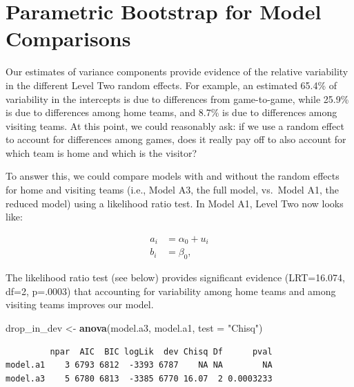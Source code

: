 \documentclass[
]{krantz}
\newenvironment{Shaded}{\begin{snugshade}}{\end{snugshade}}
\newcommand{\DataTypeTok}[1]{\textcolor[rgb]{0.27,0.27,0.27}{#1}}
\newcommand{\KeywordTok}[1]{\textcolor[rgb]{0.27,0.27,0.27}{\textbf{#1}}}
\newcommand{\NormalTok}[1]{#1}
\newcommand{\StringTok}[1]{\textcolor[rgb]{0.5,0.5,0.5}{#1}}
\begin{document}
\hypertarget{glmm-paraboot}{%
\section{Parametric Bootstrap for Model Comparisons}\label{glmm-paraboot}}

Our estimates of variance components provide evidence of the relative variability in the different Level Two random effects. For example, an estimated 65.4\% of variability in the intercepts is due to differences from game-to-game, while 25.9\% is due to differences among home teams, and 8.7\% is due to differences among visiting teams. At this point, we could reasonably ask: if we use a random effect to account for differences among games, does it really pay off to also account for which team is home and which is the visitor?

To answer this, we could compare models with and without the random effects for home and visiting teams (i.e., Model A3, the full model, vs.~Model A1, the reduced model) using a likelihood ratio test. In Model A1, Level Two now looks like:

\begin{align*}
a_{i} & = \alpha_{0}+u_{i} \\
b_{i} & = \beta_{0},
\end{align*}

The likelihood ratio test (see below) provides significant evidence (LRT=16.074, df=2, p=.0003) that accounting for variability among home teams and among visiting teams improves our model.

\begin{Shaded}
\begin{Highlighting}[]
\NormalTok{drop_in_dev <-}\StringTok{ }\KeywordTok{anova}\NormalTok{(model.a3, model.a1, }\DataTypeTok{test =} \StringTok{"Chisq"}\NormalTok{)}
\end{Highlighting}
\end{Shaded}

\begin{verbatim}
         npar  AIC  BIC logLik  dev Chisq Df      pval
model.a1    3 6793 6812  -3393 6787    NA NA        NA
model.a3    5 6780 6813  -3385 6770 16.07  2 0.0003233
\end{verbatim}
\end{document}
